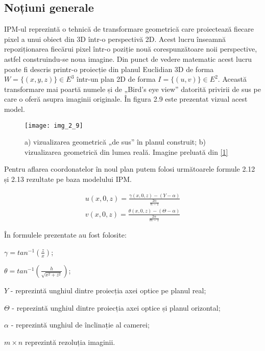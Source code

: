 \subsection{Noțiuni generale}

IPM-ul reprezintă o tehnică de transformare geometrică care proiectează fiecare pixel a unui obiect din 3D într-o perspectivă 2D. Acest lucru înseamnă repoziționarea fiecărui pixel într-o poziție nouă corespunzătoare noii perspective, astfel construindu-se noua imagine. Din punct de vedere matematic acest lucru poate fi descris printr-o proiecție din planul Euclidian 3D de forma $W = \{(x,y,z)\} \in E^3$ într-un plan 2D de forma $I = \{(u,v)\} \in E^2$. Această transformare mai poartă numele și de „Bird's eye view” datorită privirii de sus pe care o oferă asupra imaginii originale. În figura 2.9 este prezentat vizual acest model.

\begin{figure}[!h]
	\centering
	\texttt{[image: img\_2\_9]}
	\caption[Modelul IPM]{a) vizualizarea geometrică „de sus” în planul construit; b) vizualizarea geometrică din lumea reală. Imagine preluată din \hyperlink{AnuarMikdadMuadAiniHussainSalinaAbdulSamadMohdMarzukiMustaffaBurhanuddinYeopMajlis}{[1]}}
	\label{fig:nonfloat}
\end{figure}

Pentru aflarea coordonatelor în noul plan putem folosi următoarele formule 2.12 și 2.13 rezultate pe baza modelului IPM.

\begin{align}	
	u(x,0,z) = \frac{\gamma(x,0,z) - (Y-\alpha)}{\frac{2\alpha}{n-1}}
\end{align}
\begin{align}	
	v(x,0,z) = \frac{\theta(x,0,z) - (\Theta - \alpha)}{\frac{2\alpha}{m-1}}
\end{align}

În formulele prezentate au fost folosite:

$\gamma = tan^{-1}(\frac{z}{x})$;

$\theta = tan^{-1}(\frac{h}{\sqrt{x^2+z^2}})$;

$Y$ - reprezintă unghiul dintre proiecția axei optice pe planul real; 

$\Theta$ - reprezintă unghiul dintre proiecția axei optice și planul orizontal;
 
$\alpha$ - reprezintă unghiul de înclinație al camerei;

$m \times n$ reprezintă rezoluția imaginii.

